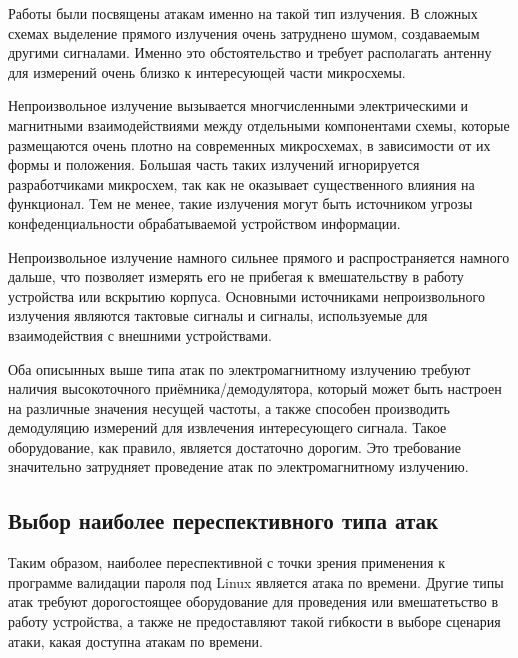 Работы \cite{ema1} \cite{ema2} были посвящены атакам именно на такой тип
излучения. В сложных схемах выделение прямого излучения очень затруднено шумом,
создаваемым другими сигналами. Именно это обстоятельство и требует располагать
антенну для измерений очень близко к интересующей части микросхемы.

Непроизвольное излучение вызывается многчисленными электрическими и магнитными
взаимодействиями между отдельными компонентами схемы, которые размещаются очень
плотно на современных микросхемах, в зависимости от их формы и положения.
Большая часть таких излучений игнорируется разработчиками микросхем, так как не
оказывает существенного влияния на функционал. Тем не менее, такие излучения
могут быть источником угрозы конфеденциальности обрабатываемой устройством
информации.

Непроизвольное излучение намного сильнее прямого и распространяется намного
дальше, что позволяет измерять его не прибегая к вмешательству в работу
устройства или вскрытию корпуса. Основными источниками непроизвольного
излучения являются тактовые сигналы и сигналы, используемые для взаимодействия
с внешними устройствами.

Оба описынных выше типа атак по электромагнитному излучению требуют наличия
высокоточного приёмника/демодулятора, который может быть настроен на различные
значения несущей частоты, а также способен производить демодуляцию измерений
для извлечения интересующего сигнала. Такое оборудование, как правило, является
достаточно дорогим. Это требование значительно затрудняет проведение атак по
электромагнитному излучению.

\subsection{Выбор наиболее переспективного типа атак}

Таким образом, наиболее переспективной с точки зрения применения к программе
валидации пароля под Linux является атака по времени. Другие типы атак требуют
дорогостоящее оборудование для проведения или вмешатетьство в работу устройства,
а также не предоставляют такой гибкости в выборе сценария атаки, какая доступна
атакам по времени.

\clearpage
